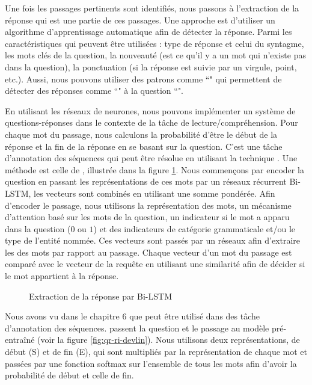 \documentclass{KodeBook}
\begin{document}
Une fois les passages pertinents sont identifiés, nous passons à l'extraction de la réponse qui est une partie de ces passages. 
Une approche est d'utiliser un algorithme d'apprentissage automatique afin de détecter la réponse. 
Parmi les caractéristiques qui peuvent être utilisées : type de réponse et celui du syntagme, les mots clés de la question, la nouveauté (est ce qu'il y a un mot qui n'existe pas dans la question), la ponctuation (si la réponse est suivie par un virgule, point, etc.). 
Aussi, nous pouvons utiliser des patrons comme ``" qui permettent de détecter des réponses comme ``" à la question ``".


En utilisant les réseaux de neurones, nous pouvons implémenter un système de questions-réponses dans le contexte de la tâche de lecture/compréhension. 
Pour chaque mot du passage, nous calculons la probabilité d'être le début de la réponse et la fin de la réponse en se basant sur la question. 
C'est une tâche d'annotation des séquences qui peut être résolue en utilisant la technique .
Une méthode est celle de \citet{2017-chen-al}, illustrée dans la figure \ref{fig:qr-ri-chen}. 
Nous commençons par encoder la question en passant les représentations  de ces mots par un réseaux récurrent Bi-LSTM, les vecteurs sont combinés en utilisant une somme pondérée. 
Afin d'encoder le passage, nous utilisons la représentation  des mots, un mécanisme d'attention basé sur les mots de la question, un indicateur si le mot a apparu dans la question ($0$ ou $1$) et des indicateurs de catégorie grammaticale et/ou le type de l'entité nommée.
Ces vecteurs sont passés par un réseaux  afin d'extraire les  des mots par rapport au passage. 
Chaque vecteur d'un mot du passage est comparé avec le vecteur de la requête en utilisant une similarité afin de décider si le mot appartient à la réponse.

\begin{figure}[!ht]
	\centering
	\caption[Extraction de la réponse par Bi-LSTM]{Extraction de la réponse par Bi-LSTM \cite{2019-jurafsky-martin}}
	\label{fig:qr-ri-chen}
\end{figure}

Nous avons vu dans le chapitre 6 que  peut être utilisé dans des tâche d'annotation des séquences.
\citet{2018-devlin-al} passent la question et le passage au modèle pré-entraîné  (voir la figure \ref{fig:qr-ri-devlin}).
Nous utilisons deux représentations, de début (S) et de fin (E), qui sont multipliés par la représentation de chaque mot et passées par une fonction softmax sur l'ensemble de tous les mots afin d'avoir la probabilité de début et celle de fin.
\end{document}
